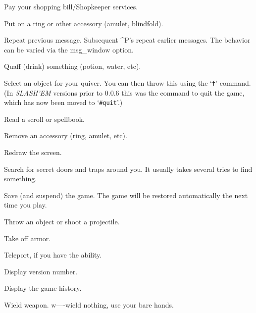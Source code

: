 \item[\tb{{\rm p}}]
Pay your shopping bill/Shopkeeper services.

\item[\tb{{\rm P}}]
Put on a ring or other accessory (amulet, blindfold).

\item[\tb{\^{}{\rm P}}]
Repeat previous message.  Subsequent \^{}P's repeat earlier messages.
The behavior can be varied via the msg\_window option.

\item[\tb{{\rm q}}]
Quaff (drink) something (potion, water, etc).

\item[\tb{{\rm Q}}]
Select an object for your quiver.  You can then throw this using
the `{\tt f}' command.  (In {\it SLASH'EM\/} versions prior to 0.0.6 this was the command
to quit the game, which has now been moved to `{\tt \#quit}'.)

\item[\tb{{\rm r}}]
Read a scroll or spellbook.

\item[\tb{{\rm R}}]
Remove an accessory (ring, amulet, etc).

\item[\tb{\^{}{\rm R}}]
Redraw the screen.

\item[\tb{{\rm s}}]
Search for secret doors and traps around you.  It usually takes several
tries to find something.

\item[\tb{{\rm S}}]
Save (and suspend) the game.  The game will be restored automatically the
next time you play.

\item[\tb{{\rm t}}]
Throw an object or shoot a projectile.

\item[\tb{{\rm T}}]
Take off armor.

\item[\tb{\^{}{\rm T}}]
Teleport, if you have the ability.

\item[\tb{{\rm v}}]
Display version number.

\item[\tb{{\rm V}}]
Display the game history.

\item[\tb{{\rm w}}]
Wield weapon.
w----wield nothing, use your bare hands.

